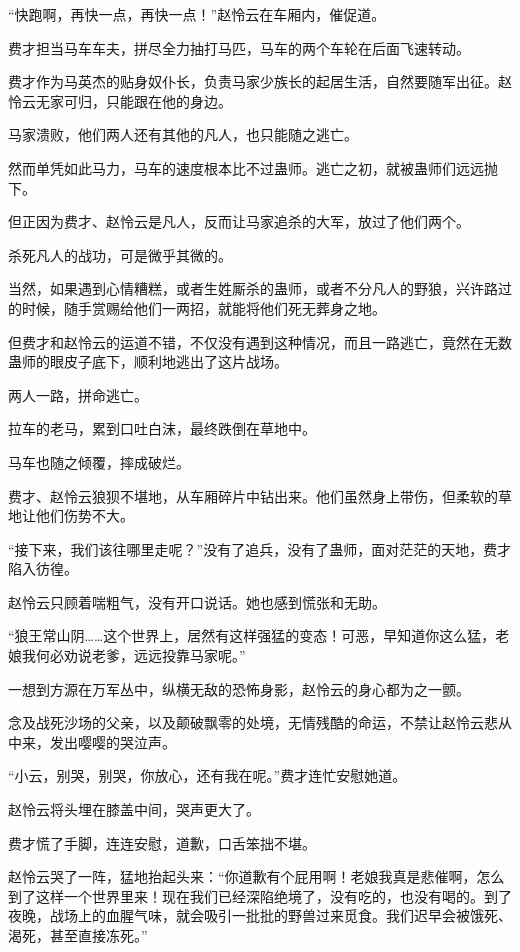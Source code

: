\begin{this_body}
“快跑啊，再快一点，再快一点！”赵怜云在车厢内，催促道。

费才担当马车车夫，拼尽全力抽打马匹，马车的两个车轮在后面飞速转动。

费才作为马英杰的贴身奴仆长，负责马家少族长的起居生活，自然要随军出征。赵怜云无家可归，只能跟在他的身边。

马家溃败，他们两人还有其他的凡人，也只能随之逃亡。

然而单凭如此马力，马车的速度根本比不过蛊师。逃亡之初，就被蛊师们远远抛下。

但正因为费才、赵怜云是凡人，反而让马家追杀的大军，放过了他们两个。

杀死凡人的战功，可是微乎其微的。

当然，如果遇到心情糟糕，或者生姓厮杀的蛊师，或者不分凡人的野狼，兴许路过的时候，随手赏赐给他们一两招，就能将他们死无葬身之地。

但费才和赵怜云的运道不错，不仅没有遇到这种情况，而且一路逃亡，竟然在无数蛊师的眼皮子底下，顺利地逃出了这片战场。

两人一路，拼命逃亡。

拉车的老马，累到口吐白沫，最终跌倒在草地中。

马车也随之倾覆，摔成破烂。

费才、赵怜云狼狈不堪地，从车厢碎片中钻出来。他们虽然身上带伤，但柔软的草地让他们伤势不大。

“接下来，我们该往哪里走呢？”没有了追兵，没有了蛊师，面对茫茫的天地，费才陷入彷徨。

赵怜云只顾着喘粗气，没有开口说话。她也感到慌张和无助。

“狼王常山阴……这个世界上，居然有这样强猛的变态！可恶，早知道你这么猛，老娘我何必劝说老爹，远远投靠马家呢。”

一想到方源在万军丛中，纵横无敌的恐怖身影，赵怜云的身心都为之一颤。

念及战死沙场的父亲，以及颠破飘零的处境，无情残酷的命运，不禁让赵怜云悲从中来，发出嘤嘤的哭泣声。

“小云，别哭，别哭，你放心，还有我在呢。”费才连忙安慰她道。

赵怜云将头埋在膝盖中间，哭声更大了。

费才慌了手脚，连连安慰，道歉，口舌笨拙不堪。

赵怜云哭了一阵，猛地抬起头来：“你道歉有个屁用啊！老娘我真是悲催啊，怎么到了这样一个世界里来！现在我们已经深陷绝境了，没有吃的，也没有喝的。到了夜晚，战场上的血腥气味，就会吸引一批批的野兽过来觅食。我们迟早会被饿死、渴死，甚至直接冻死。”


\end{this_body}
